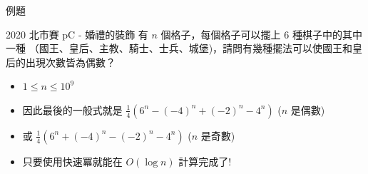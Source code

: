 \documentclass[aspectratio=169]{beamer}
\begin{document}
    
    \begin{frame}{例題}
        \begin{block}{2020 北市賽 pC - 婚禮的裝飾}
            有 $n$ 個格子，每個格子可以擺上 $6$ 種棋子中的其中一種 （國王、皇后、主教、騎士、士兵、城堡)，請問有幾種擺法可以使國王和皇后的出現次數皆為偶數？
            \begin{itemize}
                \item $1 \le n \le 10^9$
            \end{itemize}
        \end{block}
        \begin{itemize}
            \item<1-> 因此最後的一般式就是 $\displaystyle \frac{1}{4} (6^n - (-4)^n + (-2)^n - 4^n)$ ($n$ 是偶數)
            \item<1-> 或 $\displaystyle \frac{1}{4} (6^n + (-4)^n - (-2)^n - 4^n)$ ($n$ 是奇數)
            \item<1-> 只要使用快速冪就能在 $O(\log n)$ 計算完成了!
        \end{itemize}
    \end{frame}
    
\end{document}
